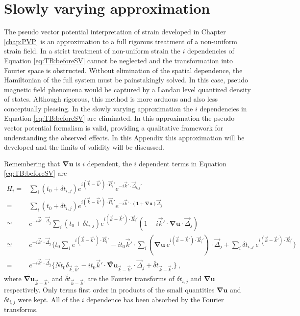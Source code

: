 \chapter{Slowly varying approximation \label{chap:idep}}

The pseudo vector potential interpretation of strain developed in Chapter \ref{chap:PVP} is an approximation to a full rigorous treatment of a non-uniform strain field.
In a strict treatment of non-uniform strain the $i$ dependencies of Equation \ref{eq:TB:beforeSV} cannot be neglected and the transformation into Fourier space is obstructed.
Without elimination of the spatial dependence, the Hamiltonian of the full system must be painstakingly solved.
In this case, pseudo magnetic field phenomena would be captured by a Landau level quantized density of states.
Although rigorous, this method is more arduous and also less conceptually pleasing.
In the slowly varying approximation the $i$ dependencies in Equation \ref{eq:TB:beforeSV} are eliminated.
In this approximation the pseudo vector potential formalism is valid, providing a qualitative framework for understanding the observed effects.
In this Appendix this approximation will be developed and the limits of validity will be discussed.

Remembering that $\bm{\nabla u}$ is $i$ dependent, the $i$ dependent terms in Equation \ref{eq:TB:beforeSV} are 
\begin{align*}
  H_i=&\sum_i \left( t_0+\delta t_{i,j} \right) e^{i(\vec{k}-\vec{k}')\cdot \vec{R}_i'}
  		e^{-i \vec{k}' \cdot \vec{\Delta}_{i,j}'} \\
  	 =&\sum_i \left( t_0+\delta t_{i,j} \right) e^{i(\vec{k}-\vec{k}')\cdot \vec{R}_i'}
  		e^{-i \vec{k}' \cdot (\bm{1}+\bm{\nabla u}) \vec{\Delta}_j} \\
  	 \simeq & e^{-i \vec{k}' \cdot \vec{\Delta}_j} \sum_i \left( t_0+\delta t_{i,j} \right)
  	 	e^{i(\vec{k}-\vec{k}')\cdot \vec{R}_i'} \left(1-i \vec{k}' \cdot \bm{\nabla u} \cdot \vec{\Delta}_j \right) \\
  	 \simeq & e^{-i \vec{k}' \cdot \vec{\Delta}_j} \bigg \{
  	 	t_0 \sum_i e^{i(\vec{k}-\vec{k}')\cdot \vec{R}_i'} 
  	 	-i t_0 \vec{k}' \cdot \sum_i \left( \bm{\nabla u} \ e^{i(\vec{k}-\vec{k}')\cdot \vec{R}_i'} \right) \cdot \vec{\Delta}_j
  	 	+\sum_i \delta t_{i,j} \  e^{i(\vec{k}-\vec{k}')\cdot \vec{R}_i'}
  	 	\bigg \} \\
  	 =& e^{-i \vec{k}' \cdot \vec{\Delta}_j} \bigg \{
      N t_0 \delta_{\vec{k},\vec{k}'}
  	 	-i t_0 \vec{k}' \cdot \widetilde{\bm{\nabla u}}_{\vec{k}-\vec{k}'} \cdot \vec{\Delta}_j + \widetilde{\delta t}_{\vec{k}-\vec{k}'} \bigg \} \ ,
\end{align*}
where $\widetilde{\bm{\nabla u}}_{\vec{k}-\vec{k}'}$ and $\widetilde{\delta t}_{\vec{k}-\vec{k}'}$ are the Fourier transforms of $\delta t_{i,j}$ and $\bm{\nabla u}$ respectively.
Only terms first order in products of the small quantities $\bm{\nabla u}$ and $\delta t_{i,j}$ were kept.
All of the $i$ dependence has been absorbed by the Fourier transforms.

